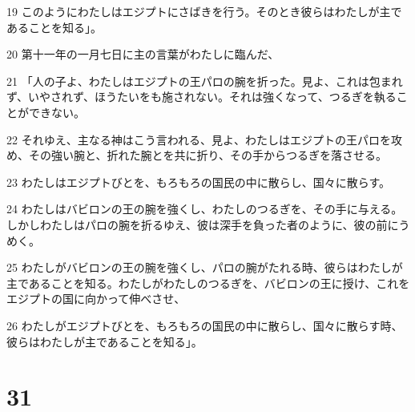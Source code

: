 \par 19 このようにわたしはエジプトにさばきを行う。そのとき彼らはわたしが主であることを知る」。
\par 20 第十一年の一月七日に主の言葉がわたしに臨んだ、
\par 21 「人の子よ、わたしはエジプトの王パロの腕を折った。見よ、これは包まれず、いやされず、ほうたいをも施されない。それは強くなって、つるぎを執ることができない。
\par 22 それゆえ、主なる神はこう言われる、見よ、わたしはエジプトの王パロを攻め、その強い腕と、折れた腕とを共に折り、その手からつるぎを落させる。
\par 23 わたしはエジプトびとを、もろもろの国民の中に散らし、国々に散らす。
\par 24 わたしはバビロンの王の腕を強くし、わたしのつるぎを、その手に与える。しかしわたしはパロの腕を折るゆえ、彼は深手を負った者のように、彼の前にうめく。
\par 25 わたしがバビロンの王の腕を強くし、パロの腕がたれる時、彼らはわたしが主であることを知る。わたしがわたしのつるぎを、バビロンの王に授け、これをエジプトの国に向かって伸べさせ、
\par 26 わたしがエジプトびとを、もろもろの国民の中に散らし、国々に散らす時、彼らはわたしが主であることを知る」。

\chapter{31}

